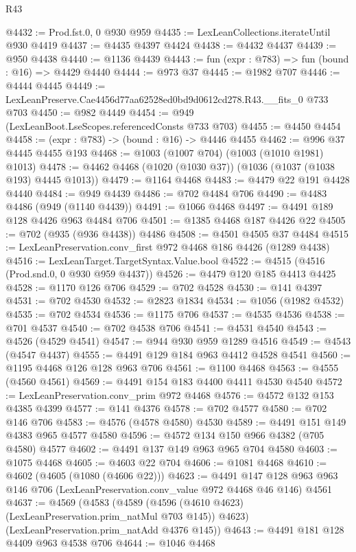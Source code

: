 \begin{lexlean}{R43}
\begin{coremodule}
@4432 := Prod.fst.{0, 0} @930 @959
@4435 := LexLeanCollections.iterateUntil @930 @4419
@4437 := @4435 @4397 @4424
@4438 := @4432 @4437
@4439 := @950 @4438
@4440 := @1136 @4439
@4443 := fun (expr : @783) => fun (bound : @16) => @4429 @4440
@4444 := @973 @37
@4445 := @1982 @707
@4446 := @4444 @4445
@4449 := LexLeanPreserve.Cae4456d77aa62528ed0bd9d0612cd278.R43.__fits_0 @733 @703
@4450 := @982 @4449
@4454 := @949 (LexLeanBoot.LseScopes.referencedConsts @733 @703)
@4455 := @4450 @4454
@4458 := (expr : @783) -> (bound : @16) -> @4446 @4455
@4462 := @996 @37 @4445 @4455 @193
@4468 := @1003 (@1007 @704) (@1003 (@1010 @1981) @1013)
@4478 := @4462 @4468 (@1020 (@1030 @37)) (@1036 (@1037 (@1038 @193) @4445 @1013))
@4479 := @1164 @4468
@4483 := @4479 @22 @191 @4428 @4440
@4484 := @949 @4439
@4486 := @702 @4484 @706
@4490 := @4483 @4486 (@949 (@1140 @4439))
@4491 := @1066 @4468
@4497 := @4491 @189 @128 @4426 @963 @4484 @706
@4501 := @1385 @4468 @187 @4426 @22
@4505 := @702 (@935 (@936 @4438)) @4486
@4508 := @4501 @4505 @37 @4484
@4515 := LexLeanPreservation.conv_first @972 @4468 @186 @4426 (@1289 @4438)
@4516 := LexLeanTarget.TargetSyntax.Value.bool
@4522 := @4515 (@4516 (Prod.snd.{0, 0} @930 @959 @4437))
@4526 := @4479 @120 @185 @4413 @4425
@4528 := @1170 @126 @706
@4529 := @702 @4528
@4530 := @141 @4397
@4531 := @702 @4530
@4532 := @2823 @1834
@4534 := @1056 (@1982 @4532)
@4535 := @702 @4534
@4536 := @1175 @706
@4537 := @4535 @4536
@4538 := @701 @4537
@4540 := @702 @4538 @706
@4541 := @4531 @4540
@4543 := @4526 (@4529 @4541)
@4547 := @944 @930 @959 @1289 @4516
@4549 := @4543 (@4547 @4437)
@4555 := @4491 @129 @184 @963 @4412 @4528 @4541
@4560 := @1195 @4468 @126 @128 @963 @706
@4561 := @1100 @4468
@4563 := @4555 (@4560 @4561)
@4569 := @4491 @154 @183 @4400 @4411 @4530 @4540
@4572 := LexLeanPreservation.conv_prim @972 @4468
@4576 := @4572 @132 @153 @4385 @4399
@4577 := @141 @4376
@4578 := @702 @4577
@4580 := @702 @146 @706
@4583 := @4576 (@4578 @4580) @4530
@4589 := @4491 @151 @149 @4383 @965 @4577 @4580
@4596 := @4572 @134 @150 @966 @4382 (@705 @4580) @4577
@4602 := @4491 @137 @149 @963 @965 @704 @4580
@4603 := @1075 @4468
@4605 := @4603 @22 @704
@4606 := @1081 @4468
@4610 := @4602 (@4605 (@1080 (@4606 @22)))
@4623 := @4491
    @147
    @128
    @963
    @963
    @146
    @706
    (LexLeanPreservation.conv_value @972 @4468 @46 @146)
    @4561
@4637 := @4569
    (@4583
      (@4589 (@4596 (@4610 @4623) (LexLeanPreservation.prim_natMul @703 @145)) @4623)
      (LexLeanPreservation.prim_natAdd @4376 @145))
@4643 := @4491 @181 @128 @4409 @963 @4538 @706
@4644 := @1046 @4468

\end{coremodule}
\end{lexlean}
